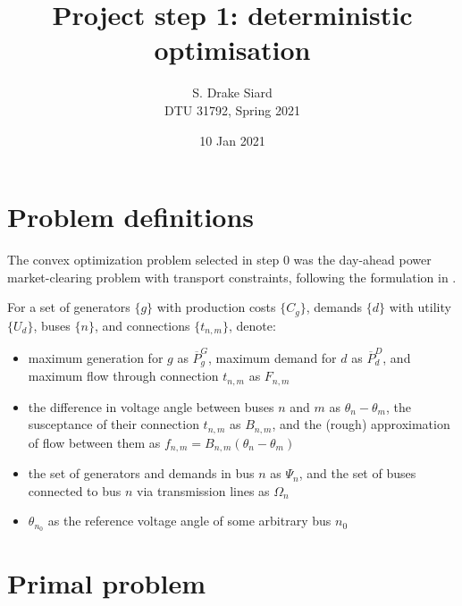 \documentclass[11pt,a4paper]{article}
\title{\textbf{Project step 1: deterministic optimisation}}
\author{S. Drake Siard\\
DTU 31792, Spring 2021}
\date{10 Jan 2021}
\begin{document}
\newcommand{\pd}{\ensuremath{p^D_d}}
\newcommand{\ud}{\ensuremath{U_d}}
\newcommand{\pg}{\ensuremath{p^G_g}}
\newcommand{\cg}{\ensuremath{C_g}}
\newcommand{\bnm}{\ensuremath{B_{n,m}}}
\newcommand{\tnm}{\ensuremath{t_{n,m}}}
\newcommand{\fnm}{\ensuremath{f_{n,m}}}
\newcommand{\FNM}{\ensuremath{F_{n,m}}}
\newcommand{\PG}{\ensuremath{\overline{P}^G_g}}
\newcommand{\PD}{\ensuremath{\overline{P}^D_d}}

\newcommand{\mud}{\ensuremath{\mu_d^D}}
\newcommand{\mug}{\ensuremath{\mu_g^G}}

\maketitle

\section{Problem definitions}

The convex optimization problem selected in step 0 was the day-ahead power market-clearing problem with transport constraints, following the formulation in \cite[pg. 11]{kazempourLectureMarketClearing2021}.

For a set of generators $\{g\}$ with production costs $\{\cg\}$, demands $\{d\}$ with utility $\{\ud\}$, buses $\{n\}$, and connections $\{\tnm\}$, denote:
 \begin{itemize}
\item maximum generation for $g$ as $\PG$, maximum demand for $d$ as $\PD$, and maximum flow through connection $\tnm$ as $\FNM$
\item the difference in voltage angle between buses $n$ and $m$ as $\theta_n - \theta_m$, the susceptance of their connection $\tnm$ as $\bnm$, and the (rough) approximation of flow between them as $\fnm = \bnm(\theta_n - \theta_m)$
\item the set of generators and demands in bus $n$ as $\Psi_n$, and the set of buses connected to bus $n$ via transmission lines as $\Omega_n$
\item $\theta_{n_0}$ as the reference voltage angle of some arbitrary bus $n_0$
\end{itemize}

\section{Primal problem}
\end{document}
